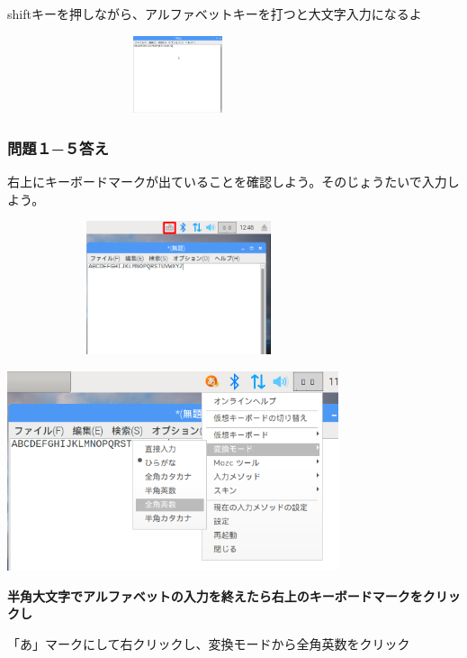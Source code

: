 \documentclass[a4paper,12pt]{jarticle}
\begin{document}
shiftキーを押しながら、アルファベットキーを打つと大文字入力になるよ


\centering
\includegraphics[width=10.031cm,height=2.27cm]{textbook-img217.png}
\flushleft

\clearpage\subsubsection{\bfseries
  問題１−５答え}

右上にキーボードマークが出ていることを確認しよう。そのじょうたいで入力しよう。


\bigskip


\centering
\includegraphics[width=10.075cm,height=3.914cm]{textbook-img218.png}
\flushleft


\bigskip





\centering
\includegraphics[width=9.733cm,height=5.851cm]{textbook-img219.png}
\flushleft


\bigskip

{\bfseries
  半角大文字でアルファベットの入力を終えたら右上のキーボードマークをクリックし

  「あ」マークにして右クリックし、変換モードから全角英数をクリック}
\end{document}
